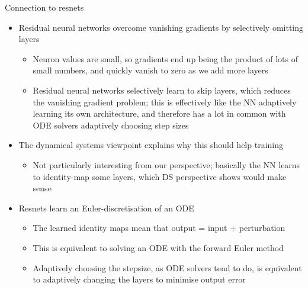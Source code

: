 \documentclass[presentation]{beamer}
\begin{document}
\begin{frame}[label={sec:orgea73078},plain]{Connection to resnets}
\begin{itemize}
\item Residual neural networks overcome vanishing gradients by selectively omitting layers
\begin{itemize}
\item Neuron values are small, so gradients end up being the product of lots of small numbers, and quickly vanish to zero as we add more layers
\item Residual neural networks selectively learn to skip layers, which reduces the vanishing gradient problem; this is effectively like the NN adaptively learning its own architecture, and therefore has a lot in common with ODE solvers adaptively choosing step sizes
\end{itemize}

\item The dynamical systems viewpoint explains why this should help training
\begin{itemize}
\item Not particularly interesting from our perspective; basically the NN learns to identity-map some layers, which DS perspective shows would make sense
\end{itemize}

\item Resnets learn an Euler-discretisation of an ODE
\begin{itemize}
\item The learned identity maps mean that output = input + perturbation
\item This is equivalent to solving an ODE with the forward Euler method
\item Adaptively choosing the stepsize, as ODE solvers tend to do, is equivalent to adaptively changing the layers to minimise output error
\end{itemize}
\end{itemize}
\end{frame}
\end{document}
